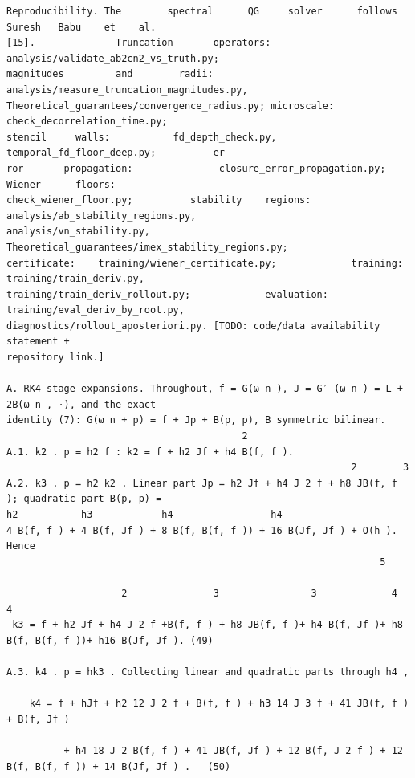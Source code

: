 \documentclass[letterpaper]{article}
\begin{document}
\begin{Verbatim}[fontsize=\fontsize{6.35}{7.15}\selectfont,breaklines=false]
Reproducibility. The        spectral      QG     solver      follows    Suresh   Babu    et    al.
[15].              Truncation       operators:           analysis/validate_ab2cn2_vs_truth.py;
magnitudes         and        radii:              analysis/measure_truncation_magnitudes.py,
Theoretical_guarantees/convergence_radius.py; microscale: check_decorrelation_time.py;
stencil     walls:           fd_depth_check.py,            temporal_fd_floor_deep.py;          er-
ror       propagation:               closure_error_propagation.py;              Wiener      floors:
check_wiener_floor.py;          stability    regions:          analysis/ab_stability_regions.py,
analysis/vn_stability.py,                 Theoretical_guarantees/imex_stability_regions.py;
certificate:    training/wiener_certificate.py;             training:     training/train_deriv.py,
training/train_deriv_rollout.py;             evaluation:          training/eval_deriv_by_root.py,
diagnostics/rollout_aposteriori.py. [TODO: code/data availability statement +
repository link.]

A. RK4 stage expansions. Throughout, f = G(ω n ), J = G′ (ω n ) = L + 2B(ω n , ·), and the exact
identity (7): G(ω n + p) = f + Jp + B(p, p), B symmetric bilinear.
                                         2
A.1. k2 . p = h2 f : k2 = f + h2 Jf + h4 B(f, f ).
                                                            2        3
A.2. k3 . p = h2 k2 . Linear part Jp = h2 Jf + h4 J 2 f + h8 JB(f, f ); quadratic part B(p, p) =
h2           h3            h4                 h4
4 B(f, f ) + 4 B(f, Jf ) + 8 B(f, B(f, f )) + 16 B(Jf, Jf ) + O(h ). Hence
                                                                 5

                    2               3                3             4                  4
 k3 = f + h2 Jf + h4 J 2 f +B(f, f ) + h8 JB(f, f )+ h4 B(f, Jf )+ h8 B(f, B(f, f ))+ h16 B(Jf, Jf ). (49)

A.3. k4 . p = hk3 . Collecting linear and quadratic parts through h4 ,
                                                                                       
    k4 = f + hJf + h2 12 J 2 f + B(f, f ) + h3 14 J 3 f + 41 JB(f, f ) + B(f, Jf )
                                                                                                   
          + h4 18 J 2 B(f, f ) + 41 JB(f, Jf ) + 12 B(f, J 2 f ) + 12 B(f, B(f, f )) + 14 B(Jf, Jf ) .   (50)


\end{Verbatim}
\end{document}
